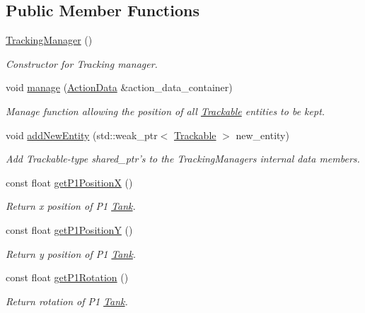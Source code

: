 \subsection*{Public Member Functions}
\begin{DoxyCompactItemize}
\item 
\hyperlink{classTrackingManager_a9fb18e3ad20bc3eb3e9e3eb2e6b5748c}{Tracking\-Manager} ()
\begin{DoxyCompactList}\small\item\em Constructor for Tracking manager. \end{DoxyCompactList}\item 
void \hyperlink{classTrackingManager_a6331ac24f748ea336db5a7303a3dce60}{manage} (\hyperlink{classActionData}{Action\-Data} \&action\-\_\-data\-\_\-container)
\begin{DoxyCompactList}\small\item\em Manage function allowing the position of all \hyperlink{classTrackable}{Trackable} entities to be kept. \end{DoxyCompactList}\item 
void \hyperlink{classTrackingManager_af0102b33b841a415bdce8605b7c0a11b}{add\-New\-Entity} (std\-::weak\-\_\-ptr$<$ \hyperlink{classTrackable}{Trackable} $>$ new\-\_\-entity)
\begin{DoxyCompactList}\small\item\em Add Trackable-\/type shared\-\_\-ptr's to the Tracking\-Managers internal data members. \end{DoxyCompactList}\item 
const float \hyperlink{classTrackingManager_ab455df1659739739b2be5f42f08e4b26}{get\-P1\-Position\-X} ()
\begin{DoxyCompactList}\small\item\em Return x position of P1 \hyperlink{classTank}{Tank}. \end{DoxyCompactList}\item 
const float \hyperlink{classTrackingManager_ab79ae59918b07ad546cd7d95cfc983f6}{get\-P1\-Position\-Y} ()
\begin{DoxyCompactList}\small\item\em Return y position of P1 \hyperlink{classTank}{Tank}. \end{DoxyCompactList}\item 
const float \hyperlink{classTrackingManager_aad99796d4377109c93177204db15d1a8}{get\-P1\-Rotation} ()
\begin{DoxyCompactList}\small\item\em Return rotation of P1 \hyperlink{classTank}{Tank}. \end{DoxyCompactList}\item 

\end{DoxyCompactItemize}
